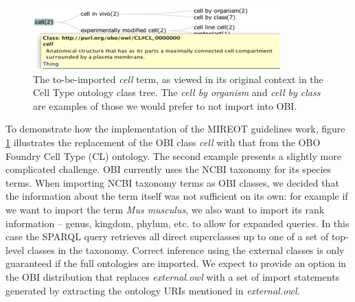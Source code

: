 \documentclass{elsart}       %
\begin{document}


\begin{figure}[t]
\centering \includegraphics*[width=1\columnwidth]{cell}
\caption{The to-be-imported \emph{cell} term, as viewed in its original context in the Cell Type ontology class tree. The \emph{cell by organism} and \emph{cell by class} are examples of those we would prefer to not import into OBI.}
\label{fig:cell}
\end{figure}


To demonstrate how the implementation of the MIREOT guidelines work, figure \ref{fig:cell} illustrates the replacement of the OBI class \emph{cell} with that from the OBO Foundry Cell Type (CL) ontology\cite{cell}.
The second example presents a slightly more complicated challenge.
OBI currently uses the NCBI taxonomy for its species terms.
When importing NCBI taxonomy terms as OBI classes, we decided that the information about the term itself was not sufficient on its own: for example if we want to import the term \emph{Mus musculus}, we also want to import its rank information – genus, kingdom, phylum, etc. to allow for expanded queries.
In this case the SPARQL query retrieves all direct superclasses up to one of a set of top-level classes in the taxonomy. 
Correct inference using the external classes is only guaranteed if the full ontologies are imported.
We expect to provide an option in the OBI distribution that replaces \textit{external.owl} with a set of import statements generated by extracting the ontology URIs mentioned in \emph{external.owl}. 
\end{document}
